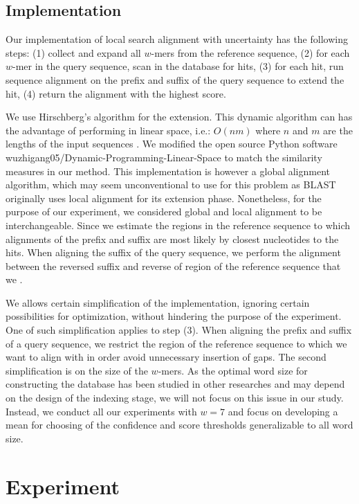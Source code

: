\documentclass{article}
\begin{document}
\subsection{Implementation}

Our implementation of local search alignment with uncertainty has the following steps: (1) collect and expand all $w$-mers from the reference sequence, (2) for each $w$-mer in the query sequence, scan in the database for hits, (3) for each hit, run sequence alignment on the prefix and suffix of the query sequence to extend the hit, (4) return the alignment with the highest score. 

We use Hirschberg's algorithm for the extension. This dynamic algorithm can has the advantage of performing in linear space, i.e.: $O(nm)$ where $n$ and $m$ are the lengths of the input sequences \cite{global_align}. We modified the open source Python software wuzhigang05/Dynamic-Programming-Linear-Space to match the similarity measures in our method. This implementation is however a global alignment algorithm, which may seem unconventional to use for this problem as BLAST originally uses local alignment for its extension phase. \cite{blast} Nonetheless, for the purpose of our experiment, we considered global and local alignment to be interchangeable. Since we estimate the regions in the reference sequence to which alignments of the prefix and suffix are most likely by closest nucleotides to the hits. When aligning the suffix of the query sequence, we perform the alignment between the reversed suffix and reverse of region of the reference sequence that we .

We allows certain simplification of the implementation, ignoring certain possibilities for optimization, without hindering the purpose of the experiment. One of such simplification applies to step (3). When aligning the prefix and suffix of a query sequence, we restrict the region of the reference sequence to which we want to align with in order avoid unnecessary insertion of gaps. The second simplification is on the size of the $w$-mers. As the optimal word size for constructing the database has been studied in other researches and may depend on the design of the indexing stage, we will not focus on this issue in our study. Instead, we conduct all our experiments with $w=7$ and focus on developing a mean for choosing of the confidence and score thresholds generalizable to all word size. 

\section{Experiment}
\end{document}
